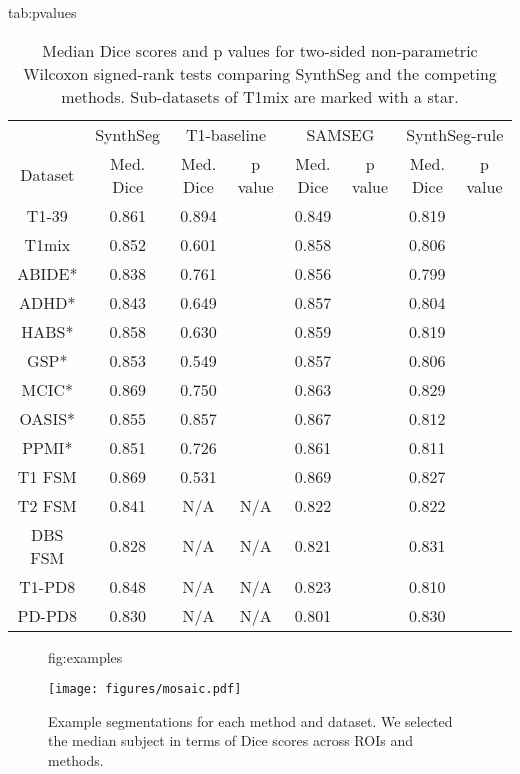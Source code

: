 \documentclass{midl}
\newcommand{\netname}{SynthSeg}
\begin{document}
\begin{table}[tbp]
\setlength\tabcolsep{3pt} 
\floatconts
  {tab:pvalues}
  {\caption{Median Dice scores and p values for two-sided non-parametric Wilcoxon signed-rank tests comparing \netname{} and the competing methods. Sub-datasets of T1mix are marked with a star.}}
  {\small \begin{tabular}{|c|c|c|c|c|c|c|c|}
  \hline
  & \netname{}  & \multicolumn{2}{c|}{T1-baseline}  &  \multicolumn{2}{c|}{SAMSEG} &   \multicolumn{2}{c|}{\netname{}-rule}  \\ \cline{2-8}
  Dataset  & Med. Dice  &  Med. Dice & p value  &   Med. Dice &  p value  &  Med. Dice  &  p value   \\ 
  \hline
  T1-39   & 0.861 & 0.894 &  &   {0.849} &   &  {0.819} &     \\ 
  T1mix   & 0.852 &  {0.601} &   & 0.858 &  & {0.806} &   \\ 
  ABIDE*  & 0.838 & {0.761} &   & 0.856 &    & {0.799} &   \\ 
  ADHD*   & 0.843  & {0.649} &   & 0.857 &    & {0.804} &   \\ 
  HABS*   & 0.858 & {0.630} &   & 0.859 &   &  {0.819} &   \\ 
  GSP*    & 0.853  & {0.549} &   & 0.857 &   &  {0.806} &   \\ 
  MCIC*   & 0.869  & {0.750} &   & {0.863} &   &  {0.829} &   \\ 
  OASIS*  & 0.855  & 0.857 &   & 0.867 &   &  {0.812} &   \\ 
  PPMI*   & 0.851  & {0.726} &   & 0.861 &   &  {0.811} &   \\
  T1 FSM  & 0.869  & {0.531} &   & 0.869 &   &  {0.827} &   \\
  T2 FSM  & 0.841   & N/A   & N/A & {0.822} &   &  {0.822} &   \\  
  DBS FSM & 0.828  & N/A & N/A  & {0.821} &   &  0.831 &   \\                 
  T1-PD8  & 0.848  & N/A & N/A  & {0.823} &   &  {0.810} &   \\  
  PD-PD8  & 0.830  & N/A  & N/A  & {0.801} &   &  0.830 &   \\   
  \hline
  \end{tabular}}
\end{table}





\begin{figure}[t]
\floatconts
  {fig:examples}
  {\caption{Example segmentations for each method and dataset. We selected the median subject in terms of Dice scores across ROIs and methods.}}
  {\texttt{[image: figures/mosaic.pdf]}}
\end{figure}
\end{document}
